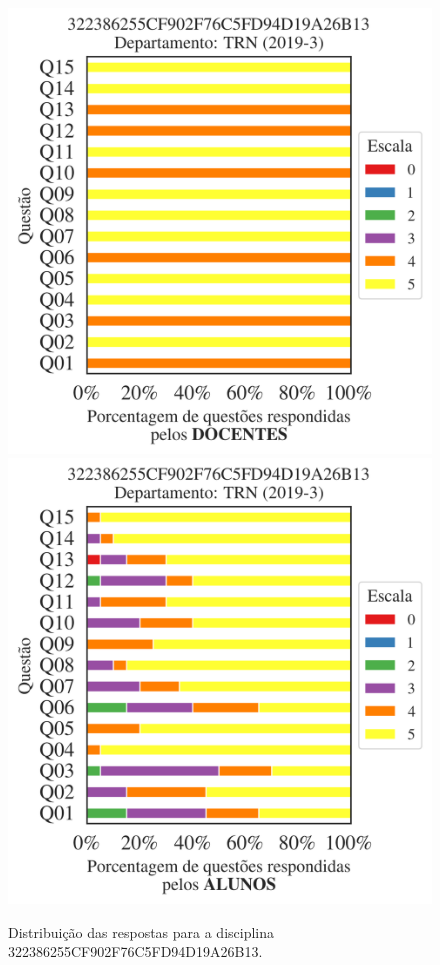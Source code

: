 \documentclass[a4paper,10pt]{article}
\begin{document}
\begin{figure}[h]
\centering
\includegraphics[width=0.485\linewidth]{analise_disciplina_departamento_TRN_322386255CF902F76C5FD94D19A26B13_docentes.png}
\includegraphics[width=0.485\linewidth]{analise_disciplina_departamento_TRN_322386255CF902F76C5FD94D19A26B13_alunos.png}
\caption{\label{fig:analise_geral_departamento}                Distribuição das respostas para a disciplina 322386255CF902F76C5FD94D19A26B13. }
\end{figure}
\end{document}
